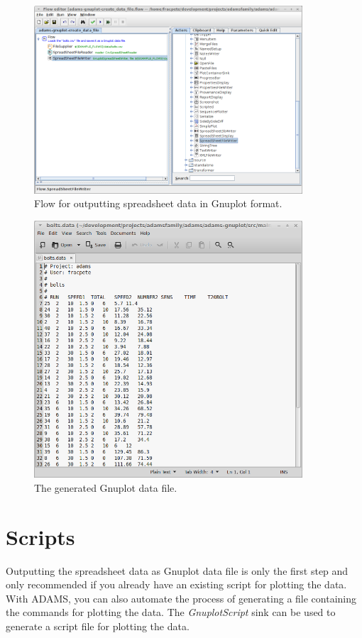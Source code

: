 \documentclass[a4paper]{book}
\begin{document}
\begin{figure}[htb]
  \centering
  \includegraphics[width=10.0cm]{images/write_data_file-flow.png}
  \caption{Flow for outputting spreadsheet data in Gnuplot format.}
  \label{write_data_file-flow}
\end{figure}

\begin{figure}[htb]
  \centering
  \includegraphics[width=10.0cm]{images/write_data_file-output.png}
  \caption{The generated Gnuplot data file.}
  \label{write_data_file-output}
\end{figure}

\clearpage
\newpage
\section{Scripts}
Outputting the spreadsheet data as Gnuplot data file is only the first step
and only recommended if you already have an existing script for plotting the
data. With ADAMS, you can also automate the process of generating a file 
containing the commands for plotting the data. The \textit{GnuplotScript}
sink can be used to generate a script file for plotting the data.
\end{document}
